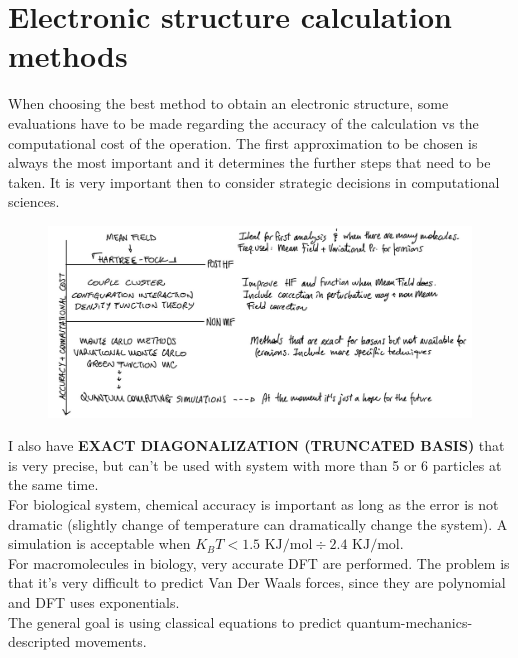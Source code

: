 \section{Electronic structure calculation methods}
When choosing the best method to obtain an electronic structure, some evaluations have to be made regarding the accuracy of the calculation vs the computational cost of the operation. The first approximation to be chosen is always the most important and it determines the further steps that need to be taken. It is very important then to consider strategic decisions in computational sciences.\\
\begin{figure}[htbp!]
	\centering
	\includegraphics[scale=0.30]{img_13}
\end{figure}
\newline
I also have \textbf{EXACT DIAGONALIZATION (TRUNCATED BASIS)} that is very precise, but can't be used with system with more than 5 or 6 particles at the same time.\\
For biological system, chemical accuracy is important as long as the error is not dramatic (slightly change of temperature can dramatically change the system). A simulation is acceptable when $K_BT < 1.5\text{ KJ/mol} \div 2.4 \text{ KJ/mol}$.\\
For macromolecules in biology, very accurate DFT are performed. The problem is that it's very difficult to predict Van Der Waals forces, since they are polynomial and DFT uses exponentials.\\
The general goal is using classical equations to predict quantum-mechanics-descripted movements.\\
